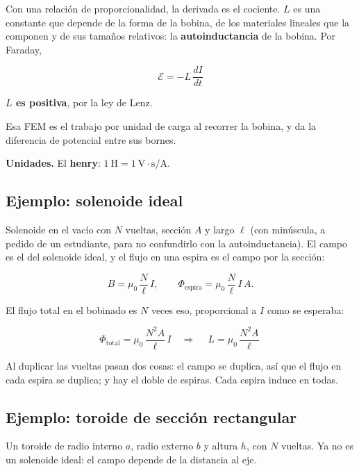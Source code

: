 \documentclass[12pt,a4paper]{article}
\begin{document}
Con una relación de proporcionalidad, la derivada es el cociente. $L$ es una
constante que depende de la forma de la bobina, de los materiales lineales que
la componen y de sus tamaños relativos: la \textbf{autoinductancia} de la bobina.
Por Faraday,

\begin{keybox}
\[
\boxed{\ \mathcal{E} = -L\,\frac{dI}{dt}\ }
\]
\end{keybox}

\begin{notebox}
\textbf{$L$ es positiva}, por la ley de Lenz.
\end{notebox}

Esa FEM es el trabajo por unidad de carga al recorrer la bobina, y da la
diferencia de potencial entre sus bornes.

\textbf{Unidades.} El \textbf{henry}: $1\ \text{H} = 1\ \text{V}\cdot\text{s}/\text{A}$.

\subsection{Ejemplo: solenoide ideal}

Solenoide en el vacío con $N$ vueltas, sección $A$ y largo $\ell$ (con
minúscula, a pedido de un estudiante, para no confundirlo con la
autoinductancia). El campo es el del solenoide ideal, y el flujo en una espira
es el campo por la sección:

\[
B = \mu_0\,\frac{N}{\ell}\,I,
\qquad
\Phi_{\text{espira}} = \mu_0\,\frac{N}{\ell}\,I\,A .
\]

El flujo total en el bobinado es $N$ veces eso, proporcional a $I$ como se
esperaba:

\[
\Phi_{\text{total}} = \mu_0\,\frac{N^2 A}{\ell}\,I
\quad\Longrightarrow\quad
\boxed{\ L = \mu_0\,\frac{N^2 A}{\ell}\ }
\]

\begin{notebox}
Al duplicar las vueltas pasan dos cosas: el campo se
duplica, así que el flujo en cada espira se duplica; y hay el doble de
espiras. Cada espira induce en todas.
\end{notebox}

\subsection{Ejemplo: toroide de sección rectangular}

Un toroide de radio interno $a$, radio externo $b$ y altura $h$, con $N$
vueltas. Ya no es un solenoide ideal: el campo depende de la distancia al eje.
\end{document}
